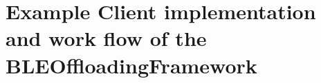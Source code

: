 \chapter{Example Client implementation and work flow of the BLEOffloadingFramework}
\label{appendix:clientimplementation}

